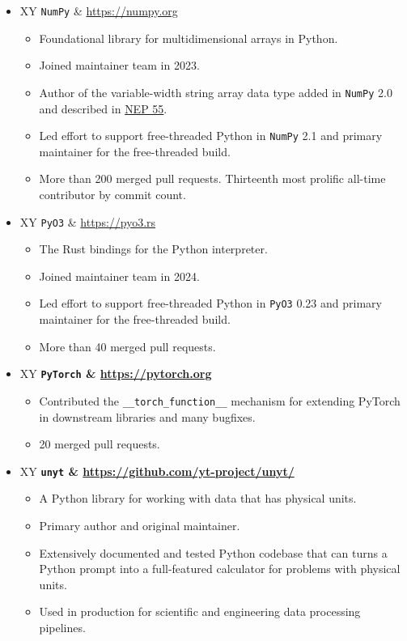 \documentclass[10pt,letterpaper]{article}
\newcommand{\textline}[2]{
  \begin{tabularx}{\textwidth}{XY}
  #1 & #2
  \end{tabularx}
}
\begin{document}
\begin{itemize}

  \item[] \textline{\texttt{NumPy}}{\href{https://numpy.org}{https://numpy.org}}
    \begin{itemize}
      \item Foundational library for multidimensional arrays in Python.
      \item Joined maintainer team in 2023.
      \item Author of the variable-width string array data type added in
        \texttt{NumPy} 2.0 and described in
        \href{https://numpy.org/neps/nep-0055-string_dtype.html}{NEP 55}.
      \item Led effort to support free-threaded Python in \texttt{NumPy} 2.1 and
        primary maintainer for the free-threaded build.
      \item More than 200 merged pull requests. Thirteenth most prolific all-time contributor by commit count.
    \end{itemize}

  \item[] \textline{\texttt{PyO3}}{\href{https://pyo3.rs}{https://pyo3.rs}}
    \begin{itemize}
      \item The Rust bindings for the Python interpreter.
      \item Joined maintainer team in 2024.
      \item Led effort to support free-threaded Python in \texttt{PyO3} 0.23 and
        primary maintainer for the free-threaded build.
      \item More than 40 merged pull requests.
    \end{itemize}

  \item[] \textline{\bf \texttt{PyTorch}}{\href{https://pytorch.org}{https://pytorch.org}}
    \begin{itemize}
      \item Contributed the \texttt{\_\_torch\_function\_\_} mechanism for
        extending PyTorch in downstream libraries and many bugfixes.
      \item 20 merged pull requests.
    \end{itemize}

    
  \item[] \textline{\bf \texttt{unyt}}{\href{https://github.com/yt-project/unyt/}{\small https://github.com/yt-project/unyt/}}
    \begin{itemize}
      \item A Python library for working with data that has physical
        units.
      \item Primary author and original maintainer.
      \item Extensively documented and tested Python codebase that can turns a
        Python prompt into a full-featured calculator for problems with physical
        units.
      \item Used in production for scientific and engineering data processing
        pipelines.
    \end{itemize}

\end{itemize}
\end{document}
